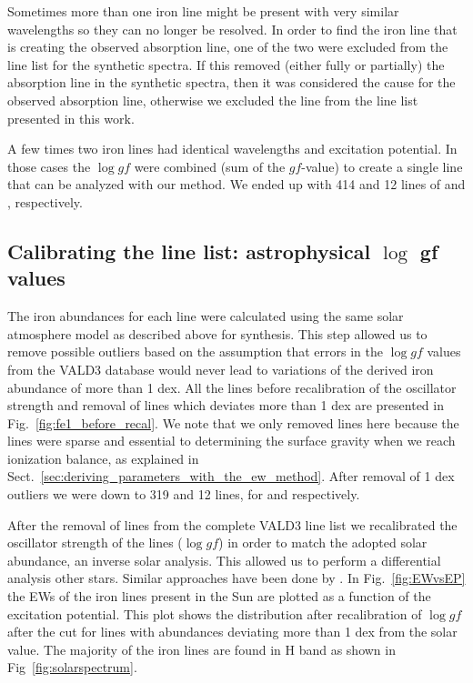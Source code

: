 \documentclass{aa}
\begin{document}
Sometimes more than one iron line might be present with very similar
wavelengths so they can no longer be resolved. In order to find the
iron line that is creating the observed absorption line, one of the two
were excluded from the line list for the synthetic spectra. If this
removed (either fully or partially) the absorption line in the synthetic
spectra, then it was considered the cause for the observed absorption
line, otherwise we excluded the line from the line list presented in
this work.

A few times two iron lines had identical wavelengths and excitation
potential. In those cases the $\log \mathit{gf}$ were combined (sum of
the $\mathit{gf}$-value) to create a single line that can be analyzed
with our method. We ended up with 414 and 12 lines of  and
, respectively.


\subsection{Calibrating the line list: astrophysical $\log$ gf values}
\label{ssub:Recalibrating-the-atomic-data}

The iron abundances for each line were calculated using the same
solar atmosphere model as described above for synthesis. This step
allowed us to remove possible outliers based on the assumption that
errors in the $\log \mathit{gf}$ values from the VALD3 database
would never lead to variations of the derived iron abundance of
more than 1 dex. All the  lines before recalibration
of the oscillator strength and removal of lines which deviates
more than 1 dex are presented in Fig.~\ref{fig:fe1_before_recal}.
We note that we only removed  lines here because the
 lines were sparse and essential to determining the
surface gravity when we reach ionization balance, as explained in
Sect.~\ref{sec:deriving_parameters_with_the_ew_method}. After removal
of 1 dex outliers we were down to 319 and 12 lines, for  and
 respectively.


After the removal of lines from the complete VALD3 line list we
recalibrated the oscillator strength of the lines ($\log\mathit{gf}$) in
order to match the adopted solar abundance, an inverse solar analysis.
This allowed us to perform a differential analysis other stars. Similar
approaches have been done by \citet{Sousa2008a,Onehag2012,Rhodin2015}.
In Fig.~\ref{fig:EWvsEP} the EWs of the iron lines present in the Sun
are plotted as a function of the excitation potential. This plot shows
the distribution after recalibration of $\log \mathit{gf}$ after the
cut for lines with abundances deviating more than 1 dex from the solar
value. The majority of the iron lines are found in H band as shown in
Fig~\ref{fig:solarspectrum}.
\end{document}
